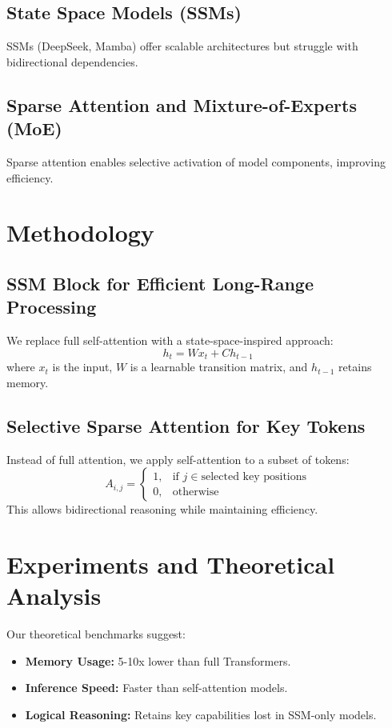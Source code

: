 \documentclass{article}
\begin{document}
\subsection{State Space Models (SSMs)}
SSMs (DeepSeek, Mamba) \cite{gu2022efficient} offer scalable architectures but struggle with bidirectional dependencies.
\subsection{Sparse Attention and Mixture-of-Experts (MoE)}
Sparse attention \cite{beltagy2020longformer} enables selective activation of model components, improving efficiency.

\section{Methodology}
\subsection{SSM Block for Efficient Long-Range Processing}
We replace full self-attention with a state-space-inspired approach:
\begin{equation}
    h_t = W x_t + C h_{t-1}
\end{equation}
where $x_t$ is the input, $W$ is a learnable transition matrix, and $h_{t-1}$ retains memory.

\subsection{Selective Sparse Attention for Key Tokens}
Instead of full attention, we apply self-attention to a subset of tokens:
\begin{equation}
    A_{i,j} =
    \begin{cases}
        1, & \text{if } j \in \text{selected key positions} \\
        0, & \text{otherwise}
    \end{cases}
\end{equation}
This allows bidirectional reasoning while maintaining efficiency.

\section{Experiments and Theoretical Analysis}
Our theoretical benchmarks suggest:
\begin{itemize}
    \item \textbf{Memory Usage:} 5-10x lower than full Transformers.
    \item \textbf{Inference Speed:} Faster than self-attention models.
    \item \textbf{Logical Reasoning:} Retains key capabilities lost in SSM-only models.
\end{itemize}
\end{document}

